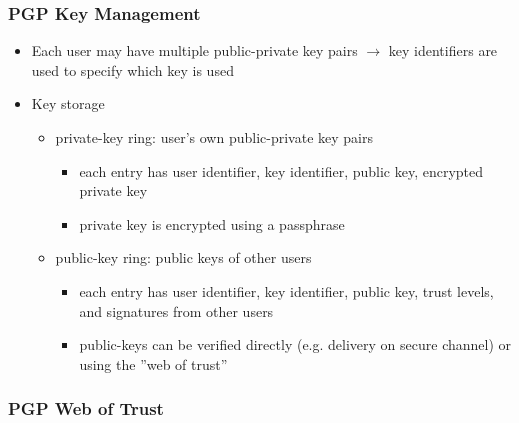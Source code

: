 \documentclass[final]{article}
\begin{document}
\subsubsection*{PGP Key Management}
\begin{itemize}[nosep]
    \item Each user may have multiple public-private key pairs $\rightarrow$ key identifiers are used to specify which key is used
    \item Key storage
          \begin{itemize}[nosep]
              \item private-key ring: user's own public-private key pairs
                    \begin{itemize}[nosep]
                        \item each entry has user identifier, key identifier, public key, encrypted private key
                        \item private key is encrypted using a passphrase
                    \end{itemize}
              \item public-key ring: public keys of other users
                    \begin{itemize}[nosep]
                        \item each entry has user identifier, key identifier, public key, trust levels, and signatures from other users
                        \item public-keys can be verified directly (e.g. delivery on secure channel) or using the ''web of trust''
                    \end{itemize}
          \end{itemize}
\end{itemize}
\subsubsection*{PGP Web of Trust}
\begin{figure}[H]
\end{figure}
\end{document}
